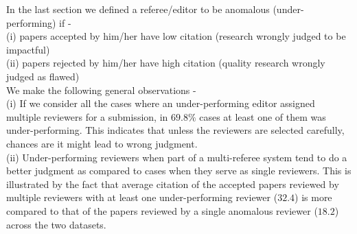 In the last section we defined a referee/editor to be anomalous (under-performing) if - \\
(i) papers accepted by him/her have low citation (research wrongly judged to be impactful)\\
(ii) papers rejected by him/her have high citation (quality research wrongly judged as flawed)\\
We make the following general observations - \\
(i) If we consider all the cases where an under-performing editor assigned multiple reviewers for a submission, in $69.8\%$ cases 
at least one of them was under-performing. This indicates that unless the reviewers are selected carefully, chances are it might lead to wrong judgment.\\
(ii) Under-performing reviewers when part of a multi-referee system tend to do a better judgment as compared to cases when they serve as single reviewers.
This is illustrated by the fact that average citation of the accepted  papers reviewed by multiple reviewers with at least one under-performing reviewer ($32.4$) 
is more compared to that of the papers reviewed by a single anomalous reviewer ($18.2$) across the two datasets.
